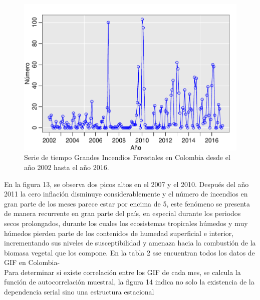 \documentclass[a4paper]{article}\usepackage[]{graphicx}\usepackage[]{color}
\makeatletter
\def\maxwidth{ %
  \ifdim\Gin@nat@width>\linewidth
    \linewidth
  \else
    \Gin@nat@width
  \fi
}
\newenvironment{knitrout}{}{} %
\makeatother
\begin{document}
\begin{knitrout}
\color{fgcolor}\begin{figure}[h]
\includegraphics[width=\maxwidth]{figure/unnamed-chunk-38-1} \caption[Serie de tiempo Grandes Incendios Forestales en Colombia desde el año 2002 hasta el año 2016]{Serie de tiempo Grandes Incendios Forestales en Colombia desde el año 2002 hasta el año 2016.}\label{fig:unnamed-chunk-38}
\end{figure}


\end{knitrout}

En la figura 13, se observa dos picos altos en el 2007 y el 2010. Después del año 2011 la cero inflación disminuye considerablemente y el número de incendios en gran parte de los meses parece estar por encima de 5, este fenómeno se presenta de manera recurrente en gran parte del país, en especial durante los periodos secos prolongados, durante los cuales los ecosistemas tropicales húmedos y muy húmedos pierden parte de los contenidos de humedad superficial e interior, incrementando sus niveles de susceptibilidad y amenaza hacia la combustión de la biomasa vegetal que los compone. En la tabla 2 sse encuentran todos los datos de GIF en Colombia-
\\
Para determinar si existe correlación entre los GIF de cada mes, se calcula la función de autocorrelación muestral, la figura 14 indica no solo la existencia de la dependencia serial sino una estructura estacional
\end{document}
